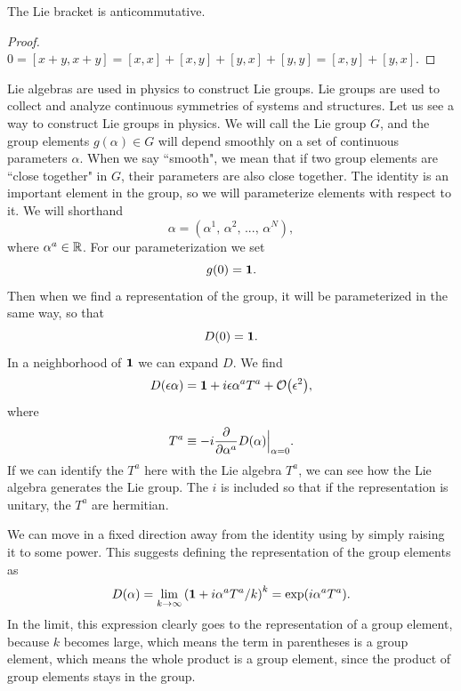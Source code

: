 \begin{proposition}{}{}
  The Lie bracket is anticommutative.
  \begin{proof}
    $0=[x+y,x+y]=[x,x]+[x,y]+[y,x]+[y,y]=[x,y]+[y,x].$
  \end{proof}
\end{proposition}

Lie algebras are used in physics to construct Lie groups.
Lie groups
are used to collect and analyze continuous symmetries of systems
and structures.
Let us see a way to construct Lie groups in physics. We will call the 
Lie group $G$, and the group elements $g(\alpha)\in G$ will depend
smoothly on a set of continuous parameters $\alpha$. When we say ``smooth", we
mean that if two group elements are ``close together" in $G$, their parameters
are also close together. The identity is an important element in the group, so
we will parameterize elements with respect to it. We will shorthand
\begin{equation}
  \alpha=\left(\alpha^1,\,\alpha^2,\,...,\,\alpha^N\right),
\end{equation}
where $\alpha^a\in\mathbb{R}$. For our parameterization we set
\begin{equation}
  g(0)={\mathbf 1}.
\end{equation}
Then when we find a representation of the group, it will be
parameterized in the same way, so that
\begin{equation}
  D(0)={\mathbf 1}.
\end{equation}
In a neighborhood of ${\mathbf 1}$ we can expand $D$. We find
\begin{equation}\label{eq:Depsilon}
  D(\epsilon\alpha)=\id+i\epsilon\alpha^aT^a+\order{\epsilon^2},
\end{equation}
where
\begin{equation}
  T^a\equiv-i\pdv{\alpha^a}D(\alpha)\Big|_{\alpha=0}.
\end{equation}
If we can identify the $T^a$ here with the Lie algebra $T^a$, we can see
how the Lie algebra generates the Lie group. The $i$ is included so that
if the representation is unitary, the $T^a$ are hermitian.

We can move in a fixed direction away from the identity using
 by simply raising it to some power. This suggests
defining the representation of the group elements as
\begin{equation}
  D(\alpha)=\lim_{k\to\infty}\left({\mathbf 1}+i\alpha^aT^a/k\right)^k
           =\exp(i\alpha^aT^a).
\end{equation}
In the limit, this expression clearly goes to the representation of a group 
element, because $k$ becomes large, which means the term in parentheses is a 
group element, which means the whole product is a group element, since the
product of group elements stays in the group.

